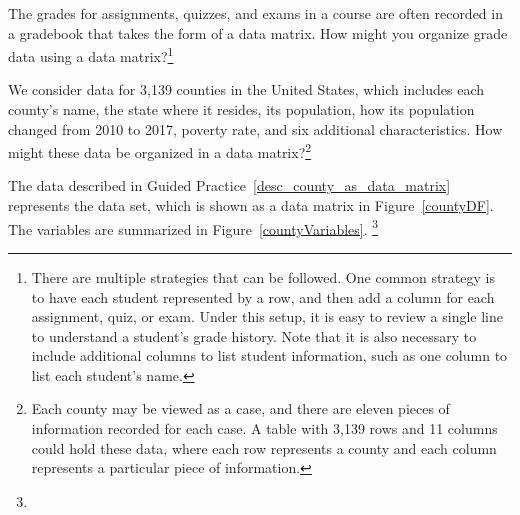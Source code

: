 \begin{exercise}
The grades for assignments, quizzes, and exams in a course are
often recorded in a gradebook that takes the form of a data matrix.
How might you organize grade data using a data
matrix?\footnote{There are multiple strategies that can be followed.
  One common strategy is to have each student represented by a row,
  and then add a column for each assignment, quiz, or exam.
  Under this setup, it is easy to review a single line to understand
  a student's grade history.
  Note that it is also necessary to include additional columns to
  list student information, such as one column to list each student's
  name.}
\end{exercise}


\begin{exercise}\label{desc_county_as_data_matrix}
We consider data for 3,139 counties in the United States,
which includes each county's name,
the state where it resides, its population,
how its population changed from 2010 to 2017,
poverty rate,
and six additional characteristics.
How might these data be organized in
a data matrix?\footnote{Each county may be viewed as a case,
  and there are eleven pieces of information recorded for
  each case.
  A table with 3,139 rows and 11 columns could hold these data,
  where each row represents a county and each column represents
  a particular piece of information.}
\end{exercise}

\noindent The data described in Guided
Practice~\ref{desc_county_as_data_matrix} represents the
 data set, which is shown as a data matrix
in Figure~\ref{countyDF}.
The variables are summarized in Figure~\ref{countyVariables}.
\footnote{}


